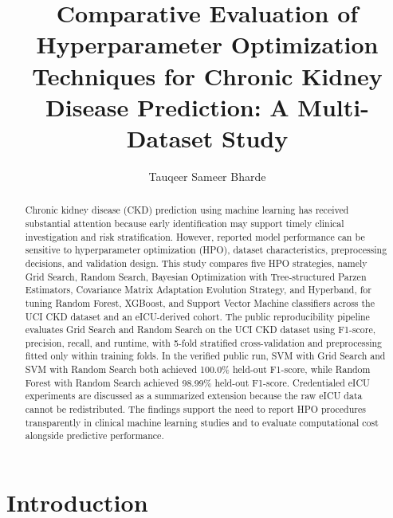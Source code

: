 \documentclass[runningheads]{llncs}
\begin{document}
\title{Comparative Evaluation of Hyperparameter Optimization Techniques for Chronic Kidney Disease Prediction: A Multi-Dataset Study}

\author{Tauqeer Sameer Bharde}


\maketitle

\begin{abstract}
Chronic kidney disease (CKD) prediction using machine learning has received substantial attention because early identification may support timely clinical investigation and risk stratification. However, reported model performance can be sensitive to hyperparameter optimization (HPO), dataset characteristics, preprocessing decisions, and validation design. This study compares five HPO strategies, namely Grid Search, Random Search, Bayesian Optimization with Tree-structured Parzen Estimators, Covariance Matrix Adaptation Evolution Strategy, and Hyperband, for tuning Random Forest, XGBoost, and Support Vector Machine classifiers across the UCI CKD dataset and an eICU-derived cohort. The public reproducibility pipeline evaluates Grid Search and Random Search on the UCI CKD dataset using F1-score, precision, recall, and runtime, with 5-fold stratified cross-validation and preprocessing fitted only within training folds. In the verified public run, SVM with Grid Search and SVM with Random Search both achieved 100.0\% held-out F1-score, while Random Forest with Random Search achieved 98.99\% held-out F1-score. Credentialed eICU experiments are discussed as a summarized extension because the raw eICU data cannot be redistributed. The findings support the need to report HPO procedures transparently in clinical machine learning studies and to evaluate computational cost alongside predictive performance.
\end{abstract}

\section{Introduction}
\end{document}
